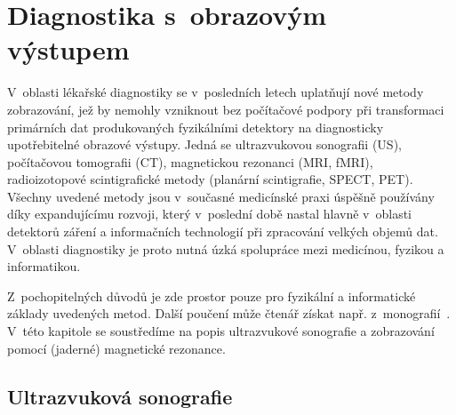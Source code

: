 
\chapter{Diagnostika s~obrazovým výstupem}\label{princtwo}%

V~oblasti lékařské diagnostiky se v~posledních
letech uplatňují nové metody zobrazování, jež by nemohly vzniknout bez
počítačové podpory při transformaci primárních dat produkovaných fyzikálními
detektory na diagnosticky upotřebitelné obrazové výstupy. Jedná se
ultrazvukovou sonografii (US), počítačovou tomografii (CT), magnetickou
rezonanci (MRI, fMRI), radioizotopové scintigrafické metody (planární
scintigrafie, SPECT, PET).  Všechny uvedené metody jsou v~současné medicínské
praxi úspěšně používány díky expandujícímu rozvoji, který v~poslední době
nastal hlavně v~oblasti detektorů záření a informačních technologií při
zpracování velkých objemů dat. V~oblasti diagnostiky je proto nutná úzká
spolupráce mezi medicínou, fyzikou a informatikou.

Z~pochopitelných důvodů je zde prostor pouze pro fyzikální a informatické
základy uvedených metod. Další poučení může čtenář získat např.
z~monografií~\cite{Dow-Ken-Joh:2006:PhysDiagImag:,%
  Roz:2006:ElePristLekar:,%
  Nav-etal:2005:MedBiofyz:}. V~této kapitole se soustředíme na popis
ultrazvukové sonografie a zobrazování pomocí (jaderné) magnetické rezonance.

\section{Ultrazvuková sonografie}\label{sono}%

